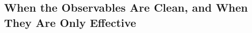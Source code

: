 \subsection{When the Observables Are Clean, and When They Are Only Effective}
\label{subsec:qcd-caveats}

